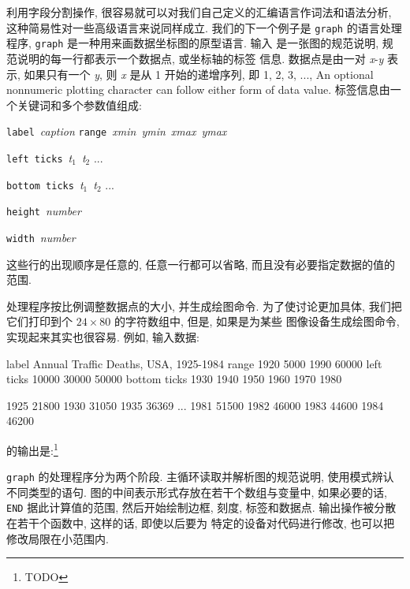 利用字段分割操作, 很容易就可以对我们自己定义的汇编语言作词法和语法分析,
这种简易性对一些高级语言来说同样成立. 我们的下一个例子是 \texttt{graph} 
的语言处理程序, \texttt{graph} 是一种用来画数据坐标图的原型语言. 输入
是一张图的规范说明, 规范说明的每一行都表示一个数据点, 或坐标轴的标签
信息. 数据点是由一对 \textit{x}-\textit{y} 表示, 如果只有一个 \textit{y},
则 \textit{x} 是从 1 开始的递增序列, 即 1, 2, 3, ..., 
An optional nonnumeric plotting character can follow either form of data
value. 标签信息由一个关键词和多个参数值组成:
\begin{pattern}
\indent\texttt{label}\ \textit{caption}
\indent\texttt{range}\ \textit{xmin}\ \textit{ymin}\ \textit{xmax}\
    \textit{ymax} \par 
\indent\texttt{left ticks}\ \textit{t}$_1$\ \textit{t}$_2$ ... \par 
\indent\texttt{bottom ticks}\ \textit{t}$_1$\ \textit{t}$_2$ ... \par 
\indent\texttt{height}\ \textit{number}\par
\indent\texttt{width}\ \textit{number}\par
\end{pattern}
这些行的出现顺序是任意的, 任意一行都可以省略, 而且没有必要指定数据的值的
范围.

处理程序按比例调整数据点的大小, 并生成绘图命令. 为了使讨论更加具体,
我们把它们打印到个 $24 \times 80$ 的字符数组中, 但是, 如果是为某些
图像设备生成绘图命令, 实现起来其实也很容易. 例如, 输入数据:
\begin{file}
    label Annual Traffic Deaths, USA, 1925-1984
    range 1920 5000 1990 60000
    left ticks 10000 30000 50000
    bottom ticks 1930 1940 1950 1960 1970 1980

    1925 21800
    1930 31050
    1935 36369
    ...
    1981 51500
    1982 46000
    1983 44600
    1984 46200
\end{file}
的输出是:\footnote{TODO}
\begin{file}
\end{file}

\texttt{graph} 的处理程序分为两个阶段. 主循环读取并解析图的规范说明, 
使用模式辨认不同类型的语句. 图的中间表示形式存放在若干个数组与变量中,
如果必要的话, \texttt{END} 据此计算值的范围, 然后开始绘制边框, 刻度,
标签和数据点. 输出操作被分散在若干个函数中, 这样的话, 即使以后要为
特定的设备对代码进行修改, 也可以把修改局限在小范围内.

